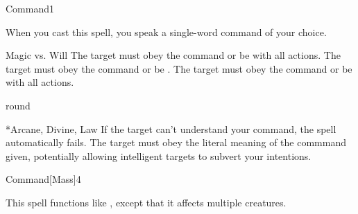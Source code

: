 \begin{spellsection}{Command}{1}
    \begin{spellheader}
    \end{spellheader}
    \begin{spellcontent}
        \begin{spelltargetinginfo}
        \end{spelltargetinginfo}
        \begin{spelleffects}
            \spellspecial When you cast this spell, you speak a single-word command of your choice.
            \begin{spellattack}{Magic vs. Will}
                \spellsuccess The target must obey the command or be \severelyimpaired with all actions.
                \spellcritical The target must obey the command or be \stunned.
                \spellfailure The target must obey the command or be \impaired with all actions.
            \end{spellattack}
             round
        \end{spelleffects}
    \end{spellcontent}
    \begin{spellfooter}
        *{Arcane, Divine, Law}
        \spellnotes If the target can't understand your command, the spell automatically fails. The target must obey the literal meaning of the commmand given, potentially allowing intelligent targets to subvert your intentions.
        \miscastrandom
    \end{spellfooter}
\end{spellsection}

\begin{spellsection}{Command}[Mass]{4}
    \begin{spellheader}
    \end{spellheader}
    \begin{spellcontent}
        \begin{spelltargetinginfo}
        \end{spelltargetinginfo}
        \begin{spelleffects}
            \spellspecial This spell functions like , except that it affects multiple creatures.
        \end{spelleffects}
    \end{spellcontent}
    \begin{spellfooter}
        \miscastexplode
    \end{spellfooter}
\end{spellsection}


